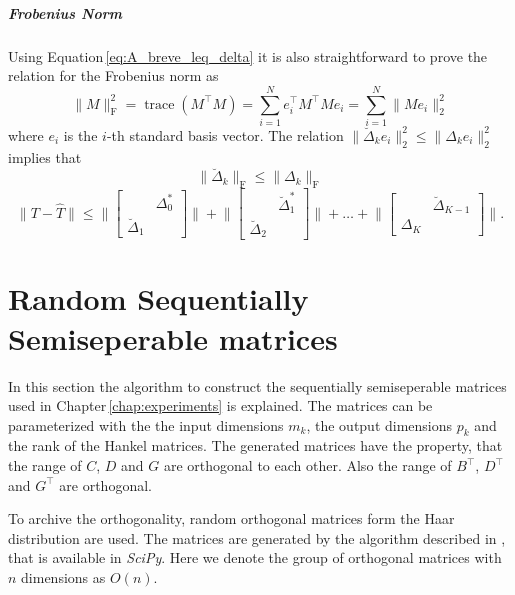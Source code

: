 \documentclass[doctype=mastersthesis,BCOR=15mm,biblatex]{ldvbook}%
\DeclareMathOperator{\trace}{trace}
\begin{document}
\paragraph{Frobenius Norm}
Using Equation\,\ref{eq:A_breve_leq_delta} it is also straightforward to prove the relation for the Frobenius norm
as 
\begin{equation}
	\|M\|_\text{F}^2 = \trace(M^\top M) = \sum_{i=1}^{N} e_i^\top M^\top M e_i = \sum_{i=1}^{N} \|M e_i\|_2^2
\end{equation}
where $e_i$ is the $i$-th standard basis vector.
The relation $\|\breve{\Delta}_k e_i\|_2^2 \leq \|\Delta_k e_i\|_2^2$ implies that 
\begin{equation}
	\|\breve{\Delta}_k\|_\text{F} \leq \|\Delta_k\|_\text{F}
\end{equation}
\begin{equation}
\|T-\hat{T}\| \leq
\Bigg\|
\begin{bmatrix}
&\Delta_0^*\\
\breve{\Delta}_1
\end{bmatrix}
\Bigg\|+\Bigg\|
\begin{bmatrix}
&\breve{\Delta}_1^*\\
\breve{\Delta}_2
\end{bmatrix}
\Bigg\|+\dots+\Bigg\|
\begin{bmatrix}
&\breve{\Delta}_{K-1}\\
\Delta_K
\end{bmatrix}
\Bigg\|.
\end{equation}


\chapter{Random Sequentially Semiseperable matrices}\label{A:random_T}

In this section the algorithm to construct the sequentially semiseperable matrices used in Chapter\,\ref{chap:experiments} is explained.
The matrices can be parameterized with the the input dimensions $m_k$, the output dimensions $p_k$ and the rank of the  Hankel matrices.
The generated matrices have the property, that the range of $C$, $D$ and $G$ are orthogonal to each other.
Also the range of $B^\top$, $D^\top$ and $G^\top$ are orthogonal.


To archive the orthogonality, random orthogonal matrices form the Haar distribution are used.
The matrices are generated by the algorithm described in \cite{mezzadri_how_2007}, that is available in \emph{SciPy}.
Here we denote the group of orthogonal matrices with $n$ dimensions as $O(n)$.
\end{document}
